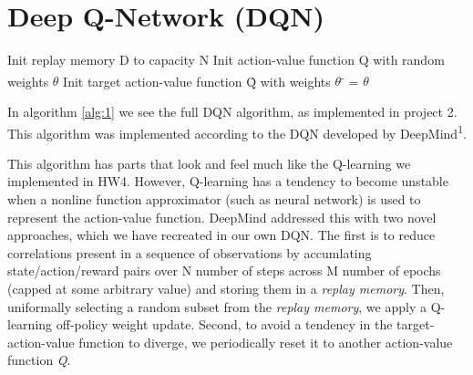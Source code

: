 \documentclass[conference]{IEEEtran}
\begin{document}
\section{Deep Q-Network (DQN)}
\begin{algorithm}
    \label{alg:1}
    \SetAlgoLined
    Init replay memory D to capacity N\;
    Init action-value function Q with random weights $\theta$\;
    Init target action-value function \^Q with weights $\theta$\textsuperscript{-} = $\theta$\;
    \caption{deep Q-learning with experience replay}
\end{algorithm}

In algorithm \ref{alg:1} we see the full DQN algorithm, as implemented in project 2. This algorithm was implemented according to the DQN developed by DeepMind\textsuperscript{1}.

This algorithm has parts that look and feel much like the Q-learning we implemented in HW4. However, Q-learning has a tendency to become unstable when a nonline function approximator (such as neural network) is used to represent the action-value function. DeepMind addressed this with two novel approaches, which we have recreated in our own DQN. The first is to reduce correlations present in a sequence of observations by accumlating state/action/reward pairs over N number of steps across M number of epochs (capped at some arbitrary value) and storing them in a \textit{replay memory}. Then, uniformally selecting a random subset from the \textit{replay memory}, we apply a Q-learning off-policy weight update. Second, to avoid a tendency in the target-action-value  function to diverge, we periodically reset it to another action-value function \textit{Q}.
\end{document}
